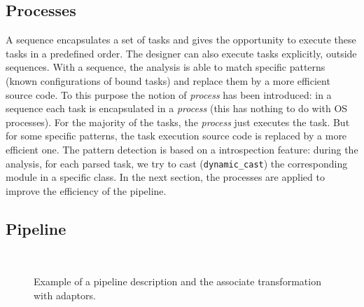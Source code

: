 \subsection{Processes}

A sequence encapsulates a set of tasks and gives the opportunity to execute
these tasks in a predefined order. The designer can also execute tasks
explicitly, outside sequences. With a sequence, the analysis is able to match
specific patterns (known configurations of bound tasks) and replace them by a
more efficient source code. To this purpose the notion of \emph{process} has
been introduced: in a sequence each task is encapsulated in a \emph{process}
(this has nothing to do with OS processes). For the majority of the tasks, the
\emph{process} just executes the task. But for some specific patterns, the task
execution source code is replaced by a more efficient one. The pattern detection
is based on a \Cxx introspection feature: during the analysis, for each parsed
task, we try to cast (\verb|dynamic_cast|) the corresponding module in a
specific class. In the next section, the processes are applied to improve the
efficiency of the pipeline.

\subsection{Pipeline}

\begin{figure}[htp]
  \centering
  \\
  \caption{Example of a pipeline description and the associate transformation
    with adaptors.}
  \label{fig:dsl_pipeline}
\end{figure}

\begin{listing}[htp]
  \inputminted[frame=lines,linenos]{C++}{\curChapter/src/pipeline/pipeline.cpp}
  \caption{\AFFECT \Cxx eDSL source code of the pipeline described in
    Figure~\ref{fig:dsl_pipeline}.}
  \label{lst:dsl_pipeline}
\end{listing}

